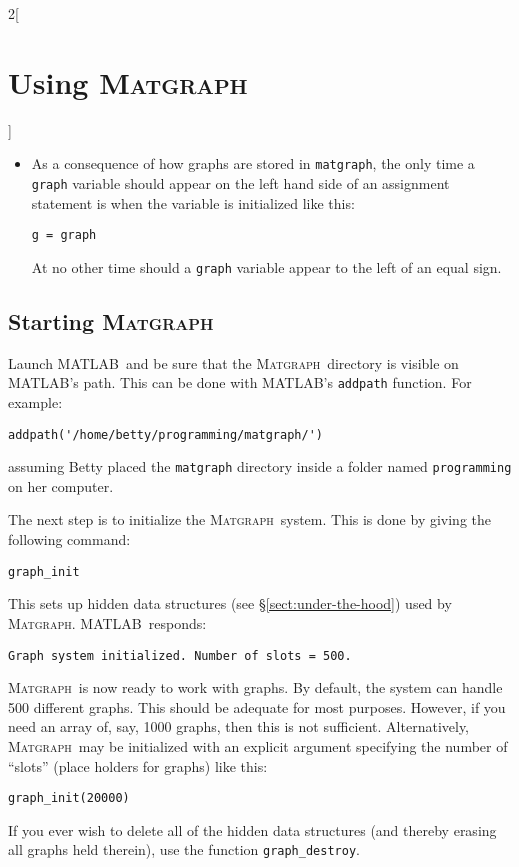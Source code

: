 \documentclass{amsart}
\newcommand\matlab{MATLAB}
\newcommand\matgraph{\textsc{Matgraph}}
\begin{document}
\begin{multicols}{2}[\section{Using \matgraph}]
\begin{itemize}
\item As a consequence of how graphs are stored in \verb|matgraph|,
  the only time a \verb|graph| variable should appear on the left hand
  side of an assignment statement is when the variable is initialized
  like this:
\begin{verbatim}
g = graph
\end{verbatim}
  At no other time should a \verb|graph| variable appear to the left
  of an equal sign.

\end{itemize}




\subsection{Starting \matgraph}
\label{subsect:getting-started}

Launch \matlab\ and be sure that the \matgraph\ directory is visible
on \matlab's path. This can be done with \matlab's \verb|addpath|
function. For example:
\begin{verbatim}
addpath('/home/betty/programming/matgraph/')
\end{verbatim}
assuming Betty placed the \verb|matgraph| directory inside a folder
named \verb|programming| on her computer. 

The next step is to initialize the \matgraph\ system. This is done
by giving the following command:
\begin{verbatim}
graph_init
\end{verbatim}
This sets up hidden data structures (see
\S\ref{sect:under-the-hood}) used by \matgraph. 
\matlab\ responds:
\begin{verbatim}
Graph system initialized. Number of slots = 500.
\end{verbatim}
\matgraph\ is now ready to work with graphs. By default, the system
can handle 500 different graphs. This should be adequate for most
purposes. However, if you need an array of, say, 1000 graphs, then
this is not sufficient. Alternatively, \matgraph\ may be initialized
with an explicit argument specifying the number of ``slots'' (place
holders for graphs) like this:
\begin{verbatim}
graph_init(20000)
\end{verbatim}

If you ever wish to delete all of the hidden data structures
(and thereby erasing all graphs held therein), use the function
\verb|graph_destroy|. 



\end{multicols}
\end{document}
